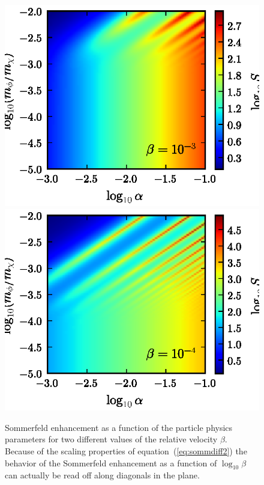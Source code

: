 \documentclass[aps,prd,twocolumn,amsmath,amssymb,floatfix,nofootinbib,10pt]{revtex4}
\newcommand{\eqnname}{equation}
\begin{document}
\begin{figure}[t]
\centering
\includegraphics{2d-3.eps}
\\
\includegraphics{2d-4.eps}
\caption{Sommerfeld enhancement as a function of the particle physics
parameters for two different values of the relative velocity
$\beta$. Because of the scaling properties of \eqnname\
(\ref{eq:sommdiff2}) the behavior of the Sommerfeld enhancement as a
function of $\log_{10}\beta$ can actually be read off along diagonals
in the plane.}%
\label{fig:sommb34}%
\end{figure}
\end{document}
